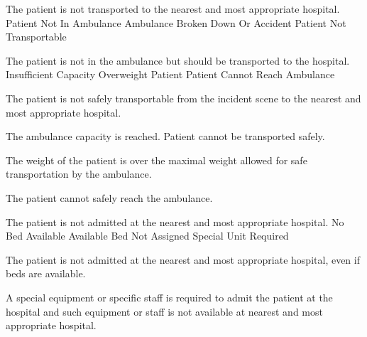   \startkaosspec
  	 {The patient is not transported to the nearest and most appropriate hospital.}
  	 {Patient Not In Ambulance}
  	 {Ambulance Broken Down Or Accident}
  	 {Patient Not Transportable}
  \stopkaosspec
  
  \startkaosspec
  	 {The patient is not in the ambulance but should be transported to the hospital.}
  	 {Insufficient Capacity}
  	 {Overweight Patient}
  	 {Patient Cannot Reach Ambulance}
  \stopkaosspec
  
  \startkaosspec
  	 {The patient is not safely transportable from the incident scene to the nearest and most appropriate hospital.}
  \stopkaosspec
  
  \startkaosspec
  	 {The ambulance capacity is reached. Patient cannot be transported safely.}
  \stopkaosspec
  
  \startkaosspec
  	 {The weight of the patient is over the maximal weight allowed for safe transportation by the ambulance.}
  \stopkaosspec
  
  \startkaosspec
  	 {The patient cannot safely reach the ambulance.}
  \stopkaosspec
  
  \startkaosspec
  	 {The patient is not admitted at the nearest and most appropriate hospital.}
  	 {No Bed Available}
  	 {Available Bed Not Assigned}
  	 {Special Unit Required}
  \stopkaosspec
  
  \startkaosspec
  	 {The patient is not admitted at the nearest and most appropriate hospital, even if beds are available.}
  \stopkaosspec
  
  \startkaosspec
  	 {A special equipment or specific staff is required to admit the patient at the hospital and such equipment or staff is not available at nearest and most appropriate hospital.}
  \stopkaosspec
  
